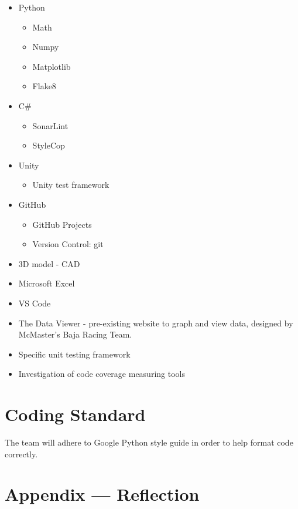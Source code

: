 \documentclass{article}
\begin{document}

\begin{itemize}
\item Python
\begin{itemize}
  \item Math
  \item Numpy
  \item Matplotlib
  \item Flake8
\end{itemize}
\item C\#
\begin{itemize}
  \item SonarLint
  \item StyleCop 
\end{itemize}
\item Unity
\begin{itemize}
  \item Unity test framework
\end{itemize}
\item GitHub
\begin{itemize}
  \item GitHub Projects
  \item Version Control: git
\end{itemize}
\item 3D model - CAD
\item Microsoft Excel
\item VS Code
\item The Data Viewer - pre-existing website to graph and view data, designed by McMaster's Baja Racing Team.
\item Specific unit testing framework
\item Investigation of code coverage measuring tools
\end{itemize}

\section{Coding Standard}

The team will adhere to Google Python style guide in order to help format code correctly. 

\newpage{}

\section*{Appendix --- Reflection}


\end{document}
